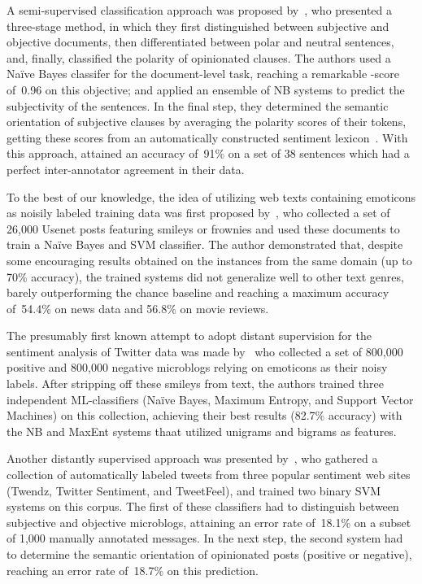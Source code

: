 \todo[inline]{}

A semi-supervised classification approach was proposed
by~\citet{Yu:03}, who presented a three-stage method, in which they
first distinguished between subjective and objective documents, then
differentiated between polar and neutral sentences, and, finally,
classified the polarity of opinionated clauses.  The authors used a
Na{\"i}ve Bayes classifer for the document-level task, reaching a
remarkable \F-score of~0.96 on this objective; and applied an ensemble
of NB systems to predict the subjectivity of the sentences.  In the
final step, they determined the semantic orientation of subjective
clauses by averaging the polarity scores of their tokens, getting
these scores from an automatically constructed sentiment
lexicon~\cite{Hatzivassi:97}.  With this approach, \citeauthor{Yu:03}
attained an accuracy of~91\% on a set of 38 sentences which had a
perfect inter-annotator agreement in their data.

\todo[inline]{}

To the best of our knowledge, the idea of utilizing web texts
containing emoticons as noisily labeled training data was first
proposed by~\citet{Read:05}, who collected a set of 26,000 Usenet
posts featuring smileys or frownies and used these documents to train
a Na{\"i}ve Bayes and SVM classifier.  The author demonstrated that,
despite some encouraging results obtained on the instances from the
same domain (up to 70\% accuracy), the trained systems did not
generalize well to other text genres, barely outperforming the chance
baseline and reaching a maximum accuracy of~54.4\% on news data and
56.8\% on movie reviews.

The presumably first known attempt to adopt distant supervision for
the sentiment analysis of Twitter data was made by~\citet{Go:09} who
collected a set of 800,000 positive and 800,000 negative microblogs
relying on emoticons as their noisy labels.  After stripping off these
smileys from text, the authors trained three independent
ML-classifiers (Na{\"i}ve Bayes, Maximum Entropy, and Support Vector
Machines) on this collection, achieving their best results (82.7\%
accuracy) with the NB and MaxEnt systems thaat utilized unigrams and
bigrams as features.

Another distantly supervised approach was presented
by~\citet{Barbosa:10}, who gathered a collection of automatically
labeled tweets from three popular sentiment web sites (Twendz, Twitter
Sentiment, and TweetFeel), and trained two binary SVM systems on this
corpus.  The first of these classifiers had to distinguish between
subjective and objective microblogs, attaining an error rate of~18.1\%
on a subset of 1,000 manually annotated messages.  In the next step,
the second system had to determine the semantic orientation of
opinionated posts (positive or negative), reaching an error rate
of~18.7\% on this prediction.

